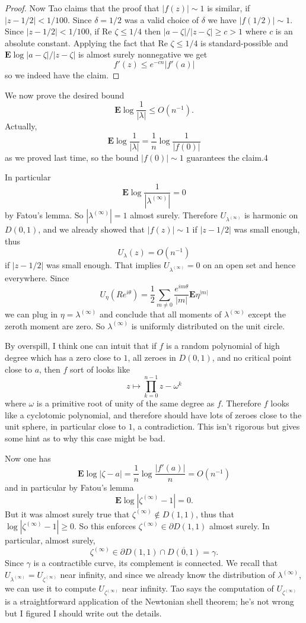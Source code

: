 \documentclass[12pt]{article}
\begin{document}
\begin{proof}
Now Tao claims that the proof that $|f(z)| \sim 1$ is similar, if $|z - 1/2| < 1/100$.
Since $\delta = 1/2$ was a valid choice of $\delta$ we have $|f(1/2)| \sim 1$.
Since $|z - 1/2| < 1/100$, if $\text{Re }\zeta \leq 1/4$ then $|a - \zeta|/|z - \zeta| \geq c > 1$ where $c$ is an absolute constant.
Applying the fact that $\text{Re }\zeta \leq 1/4$ is standard-possible and $\mathbf E \log|a-\zeta|/|z - \zeta|$ is almost surely nonnegative we get
$$f'(z) \leq e^{-cn} |f'(a)|$$
so we indeed have the claim.
\end{proof}

We now prove the desired bound
$$\mathbf E \log \frac{1}{|\lambda|} \leq O(n^{-1}).$$
Actually,
$$\mathbf E \log \frac{1}{|\lambda|} = \frac{1}{n} \log \frac{1}{|f(0)|}$$
as we proved last time, so the bound $|f(0)| \sim 1$ guarantees the claim.4

In particular
$$\mathbf E \log \frac{1}{|\lambda^{(\infty)}|} = 0$$
by Fatou's lemma. So $|\lambda^{(\infty)}| = 1$ almost surely.
Therefore $U_{\lambda^{(\infty)}}$ is harmonic on $D(0, 1)$, and we already showed that $|f(z)| \sim 1$ if $|z - 1/2|$ was small enough, thus
$$U_\lambda(z) = O(n^{-1})$$
if $|z - 1/2|$ was small enough.
That implies $U_{\lambda^{(\infty)}} = 0$ on an open set and hence everywhere.
Since
$$U_\eta(Re^{i\theta}) = \frac{1}{2} \sum_{m \neq 0} \frac{e^{im\theta}}{|m|} \mathbf E\eta^{|m|}$$
we can plug in $\eta = \lambda^{(\infty)}$ and conclude that all moments of $\lambda^{(\infty)}$ except the zeroth moment are zero.
So $\lambda^{(\infty)}$ is uniformly distributed on the unit circle.

By overspill, I think one can intuit that if $f$ is a random polynomial of high degree which has a zero close to $1$, all zeroes in $D(0, 1)$, and no critical point close to $a$, then $f$ sort of looks like
$$z \mapsto \prod_{k=0}^{n-1} z - \omega^k$$
where $\omega$ is a primitive root of unity of the same degree as $f$.
Therefore $f$ looks like a cyclotomic polynomial, and therefore should have lots of zeroes close to the unit sphere, in particular close to $1$, a contradiction.
This isn't rigorous but gives some hint as to why this case might be bad.

Now one has
$$\mathbf E \log |\zeta - a| = \frac{1}{n} \log \frac{|f'(a)|}{n} = O(n^{-1})$$
and in particular by Fatou's lemma
$$\mathbf E \log |\zeta^{(\infty)} - 1| = 0.$$
But it was almost surely true that $\zeta^{(\infty)} \notin D(1, 1)$, thus that $\log |\zeta^{(\infty)} - 1| \geq 0$.
So this enforces $\zeta^{(\infty)} \in \partial D(1, 1)$ almost surely.
In particular, almost surely,
$$\zeta^{(\infty)} \in \partial D(1, 1) \cap \overline{D(0, 1)} = \gamma.$$
Since $\gamma$ is a contractible curve, its complement is connected.
We recall that $U_{\lambda^{(\infty)}} = U_{\zeta^{(\infty)}}$ near infinity, and since we already know the distribution of $\lambda^{(\infty)}$, we can use it to compute $U_{\zeta^{(\infty)}}$ near infinity.
Tao says the computation of $U_{\zeta^{(\infty)}}$ is a straightforward application of the Newtonian shell theorem; he's not wrong but I figured I should write out the details.
\end{document}
